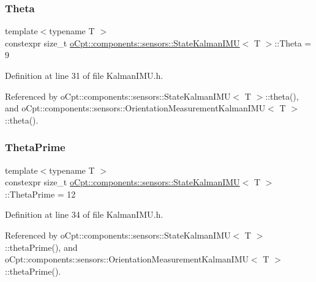 \subsubsection{\texorpdfstring{Theta}{Theta}}
{\footnotesize\ttfamily template$<$typename T $>$ \\
constexpr size\+\_\+t \hyperlink{classo_cpt_1_1components_1_1sensors_1_1_state_kalman_i_m_u}{o\+Cpt\+::components\+::sensors\+::\+State\+Kalman\+I\+MU}$<$ T $>$\+::Theta = 9\hspace{0.3cm}{\ttfamily [static]}}



Definition at line 31 of file Kalman\+I\+M\+U.\+h.



Referenced by o\+Cpt\+::components\+::sensors\+::\+State\+Kalman\+I\+M\+U$<$ T $>$\+::theta(), and o\+Cpt\+::components\+::sensors\+::\+Orientation\+Measurement\+Kalman\+I\+M\+U$<$ T $>$\+::theta().

\hypertarget{classo_cpt_1_1components_1_1sensors_1_1_state_kalman_i_m_u_a6b244cd9a4315e36b1872b30d1127810}{}\label{classo_cpt_1_1components_1_1sensors_1_1_state_kalman_i_m_u_a6b244cd9a4315e36b1872b30d1127810} 
\subsubsection{\texorpdfstring{Theta\+Prime}{ThetaPrime}}
{\footnotesize\ttfamily template$<$typename T $>$ \\
constexpr size\+\_\+t \hyperlink{classo_cpt_1_1components_1_1sensors_1_1_state_kalman_i_m_u}{o\+Cpt\+::components\+::sensors\+::\+State\+Kalman\+I\+MU}$<$ T $>$\+::Theta\+Prime = 12\hspace{0.3cm}{\ttfamily [static]}}



Definition at line 34 of file Kalman\+I\+M\+U.\+h.



Referenced by o\+Cpt\+::components\+::sensors\+::\+State\+Kalman\+I\+M\+U$<$ T $>$\+::theta\+Prime(), and o\+Cpt\+::components\+::sensors\+::\+Orientation\+Measurement\+Kalman\+I\+M\+U$<$ T $>$\+::theta\+Prime().

\hypertarget{classo_cpt_1_1components_1_1sensors_1_1_state_kalman_i_m_u_a7236194c98fe1342621db5e1212a5c9c}{}\label{classo_cpt_1_1components_1_1sensors_1_1_state_kalman_i_m_u_a7236194c98fe1342621db5e1212a5c9c} 
